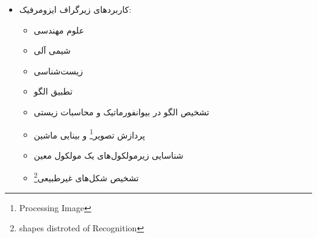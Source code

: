 \documentclass[a4paper,10pt]{article}
\begin{document}
\begin{itemize}
        \item کاربردهای زیرگراف ایزومرفیک:
        
        \begin{itemize}
            
            \item علوم مهندسی
            
            \item شیمی آلی

            \item زیست‌شناسی

            \item تطبیق الگو
            
            \item تشخیص الگو در بیوانفورماتیک و محاسبات زیستی

            \item پردازش تصویر\footnote{\hspace{2pt}Processing Image} و بینایی ماشین

            \item شناسایی زیرمولکول‌های یک مولکول‌ معین

            \item تشخیص شکل‌های غیرطبیعی\footnote{\hspace{2pt}shapes distroted of Recognition}

        \end{itemize}

    \end{itemize}

    \noindent\hrulefill
\end{document}
